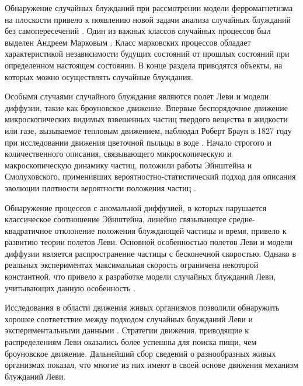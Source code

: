 Обнаружение случайных блужданий при рассмотрении модели ферромагнетизма на плоскости привело к появлению новой задачи анализа случайных блужданий без самопересечений \cite{gee_interaction_1946}. Один из важных классов случайных процессов был выделен Андреем Марковым \cite{markov_wahrscheinlichkeitsrechnung_1912}. Класс марковских процессов обладает характеристикой независимости будущих состояний от прошлых состояний при определенном настоящем состоянии. В конце раздела приводятся объекты, на которых можно осуществлять случайные блуждания.

Особыми случаями случайного блуждания являются полет Леви и модели диффузии, такие как броуновское движение. Впервые беспорядочное движение микроскопических видимых взвешенных частиц твердого вещества в жидкости или газе, вызываемое тепловым движением, наблюдал Роберт Браун в 1827 году при исследовании движения цветочной пыльцы в воде \cite{brown_brief_2015}. Начало строгого и количественного описания, связывающего микроскопическую и макроскопическую динамику частиц, положили работы Эйнштейна и Смолуховского, применивших вероятностно-статистический подход для описания эволюции плотности вероятности положения частиц \cite{einstein_uber_1905,vonsmoluchowski_zur_1906}.

Обнаружение процессов с аномальной диффузией, в которых нарушается классическое соотношение Эйнштейна, линейно связывающее средне-квадратичное отклонение положения блуждающей частицы и время, привело к развитию теории полетов Леви. Основной особенностью полетов Леви и модели диффузии является распространение частицы с бесконечной скоростью. Однако в реальных экспериментах максимальная скорость ограничена некоторой константной, что привело к разработке модели случайных блужданий Леви, учитывающих данную особенность \cite{gnedenko_predelnye_1949}.

Исследования в области движения живых организмов позволили обнаружить хорошее соответствие между подходом случайных блужданий Леви и экспериментальными данными \cite{shlesinger_levy_1986}. Стратегии движения, приводящие к распределениям Леви оказались более успешны для поиска пищи, чем броуновское движение. Дальнейший сбор сведений о разнообразных живых организмах показал, что многие из них имеют в своей основе движения механизм блужданий Леви.

